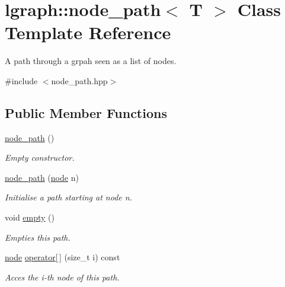 \hypertarget{classlgraph_1_1node__path}{}\section{lgraph\+:\+:node\+\_\+path$<$ T $>$ Class Template Reference}
\label{classlgraph_1_1node__path}


A path through a grpah seen as a list of nodes.  




{\ttfamily \#include $<$node\+\_\+path.\+hpp$>$}

\subsection*{Public Member Functions}
\begin{DoxyCompactItemize}
\item 
\mbox{\label{classlgraph_1_1node__path_a91814e22e41ebfd16223fff389819ae9}} 
\hyperlink{classlgraph_1_1node__path_a91814e22e41ebfd16223fff389819ae9}{node\+\_\+path} ()
\begin{DoxyCompactList}\small\item\em Empty constructor. \end{DoxyCompactList}\item 
\hyperlink{classlgraph_1_1node__path_ae998efffa65b591d68fbab35f2218120}{node\+\_\+path} (\hyperlink{namespacelgraph_a397169dd66adf725210a30fb7251773e}{node} n)
\begin{DoxyCompactList}\small\item\em Initialise a path starting at node {\itshape n}. \end{DoxyCompactList}\item 
void \hyperlink{classlgraph_1_1node__path_a8e11ffbd295bea9d10ebdd2180d68732}{empty} ()
\begin{DoxyCompactList}\small\item\em Empties this path. \end{DoxyCompactList}\item 
\hyperlink{namespacelgraph_a397169dd66adf725210a30fb7251773e}{node} \hyperlink{classlgraph_1_1node__path_acdb1f0e23258673d2db5aef6e623ee4f}{operator\mbox{[}$\,$\mbox{]}} (size\+\_\+t i) const
\begin{DoxyCompactList}\small\item\em Acces the {\itshape i-\/th} node of this path. \end{DoxyCompactList}\item 

\end{DoxyCompactItemize}
